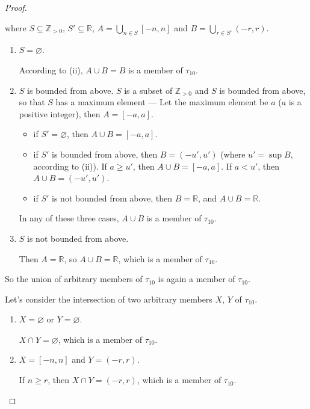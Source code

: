 \begin{proof}
\begin{enumerate}[label={(\roman*)}]
		      where $S\subseteq\mathbb{Z}_{> 0}$, $S'\subseteq\mathbb{R}$, $A = \bigcup_{n\in S} [-n, n]$ and $B = \bigcup_{r\in S'} (-r, r)$.
		      \begin{enumerate}[label={\textbf{Case \arabic*.}},itemindent=1cm]
			      \item $S = \varnothing$.

			            According to (ii), $A\cup B = B$ is a member of $\tau_{10}$.
			      \item $S$ is bounded from above.
			            $S$ is a subset of $\mathbb{Z}_{> 0}$ and $S$ is bounded from above, so that $S$ has a maximum element --- Let the maximum element be $a$ ($a$ is a positive integer), then $A = [-a, a]$.
			            \begin{itemize}
				            \item if $S' = \varnothing$, then $A\cup B = [-a, a]$.
				            \item if $S'$ is bounded from above, then $B = (-u', u')$ (where $u' = \sup B$, according to (ii)). If $a\geq u'$, then $A\cup B = [-a, a]$. If $a < u'$, then $A\cup B = (-u', u')$.
				            \item if $S'$ is not bounded from above, then $B = \mathbb{R}$, and $A\cup B = \mathbb{R}$.
			            \end{itemize}

			            In any of these three cases, $A\cup B$ is a member of $\tau_{10}$.
			      \item $S$ is not bounded from above.

			            Then $A = \mathbb{R}$, so $A\cup B = \mathbb{R}$, which is a member of $\tau_{10}$.
		      \end{enumerate}

		      So the union of arbitrary members of $\tau_{10}$ is again a member of $\tau_{10}$.

		      Let's consider the intersection of two arbitrary members $X$, $Y$ of $\tau_{10}$.
		      \begin{enumerate}[label={\textbf{Case \arabic*.}},itemindent=1cm]
			      \item $X = \varnothing$ or $Y = \varnothing$.

			            $X\cap Y = \varnothing$, which is a member of $\tau_{10}$.
			      \item $X = [-n, n]$ and $Y = (-r, r)$.

			            If $n\geq r$, then $X\cap Y = (-r, r)$, which is a member of $\tau_{10}$.


\end{enumerate}
\end{enumerate}
\end{proof}
